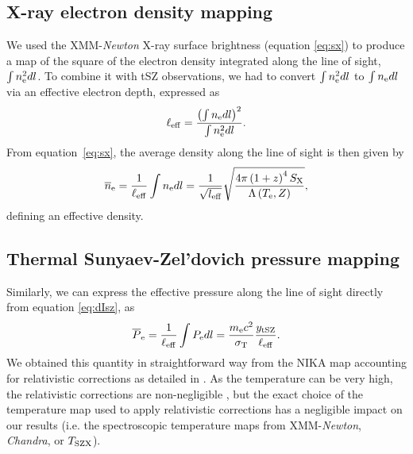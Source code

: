 \documentclass[twocolumn,traditabstract]{aa}
\def\TSZ {T_{\rm SZX}}
\begin{document}
\subsection{X-ray electron density mapping}
We used the XMM-\textit{Newton} X-ray surface brightness (equation \ref{eq:sx}) to produce a map of the square of the electron density integrated along the line of sight, $\int n_{\rm e}^2 dl$. To combine it with tSZ observations, we had to convert $\int n_{\rm e}^2 dl$ to $\int n_{\rm e} dl$ via an effective electron depth, expressed as
\begin{equation}
        \ell_{\rm eff} = \frac{\left(\int n_{\rm e} dl\right)^2}{\int n_{\rm e}^2 dl}.
\label{eq:l_eff}
\end{equation}
From equation~\ref{eq:sx}, the average density along the line of sight is then given by
\begin{equation}
        \overline{n}_{\rm e} = \frac{1}{\ell_{\rm eff}} \int n_{\rm e} dl = \frac{1}{\sqrt{l_{\rm eff}}}\sqrt{\frac{4 \pi \left(1+z\right)^4 S_{\rm X}}{\Lambda\left(T_{\rm e}, Z\right)}},
\end{equation}
defining an effective density.

\subsection{Thermal Sunyaev-Zel'dovich pressure mapping}
Similarly, we can express the effective pressure along the line of sight directly from equation \ref{eq:dIsz}, as
\begin{equation}
        \overline{P}_{\rm e} = \frac{1}{\ell_{\rm eff}} \int P_{\rm e} dl = \frac{m_{\rm e} c^2}{\sigma_{\rm T}} \frac{y_{\rm tSZ}}{\ell_{\rm eff}}.
\label{eq:pseudo_p}
\end{equation}
We obtained this quantity in straightforward way from the NIKA map accounting for relativistic corrections as detailed in \cite{Adam2016b}. As the temperature can be very high, the relativistic corrections are non-negligible \citep{Pointecouteau1998,Itoh2003}, but the exact choice of the temperature map used to apply relativistic corrections has a negligible impact on our results (i.e. the spectroscopic temperature maps from XMM-\textit{Newton}, \textit{Chandra}, or $\TSZ$).

\end{document}
